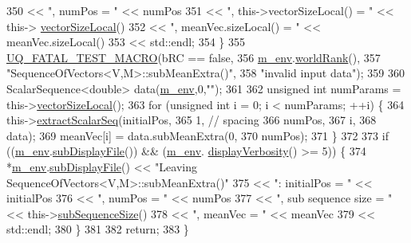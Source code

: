 \begin{DoxyCode}
350                            << \textcolor{stringliteral}{", numPos = "}                  << numPos
351                            << \textcolor{stringliteral}{", this->vectorSizeLocal() = "} << this->
      \hyperlink{class_q_u_e_s_o_1_1_base_vector_sequence_a2fefedf9e5b90f22881103b3f92555f6}{vectorSizeLocal}()
352                            << \textcolor{stringliteral}{", meanVec.sizeLocal() = "}     << meanVec.sizeLocal()
353                            << std::endl;
354   \}
355   \hyperlink{_defines_8h_a56d63d18d0a6d45757de47fcc06f574d}{UQ\_FATAL\_TEST\_MACRO}(bRC == \textcolor{keyword}{false},
356                       \hyperlink{class_q_u_e_s_o_1_1_base_vector_sequence_a8e8824d2a63c5a43bcc6473e3a0491e8}{m\_env}.\hyperlink{class_q_u_e_s_o_1_1_base_environment_a78b57112bbd0e6dd0e8afec00b40ffa7}{worldRank}(),
357                       \textcolor{stringliteral}{"SequenceOfVectors<V,M>::subMeanExtra()"},
358                       \textcolor{stringliteral}{"invalid input data"});
359 
360   ScalarSequence<double> data(\hyperlink{class_q_u_e_s_o_1_1_base_vector_sequence_a8e8824d2a63c5a43bcc6473e3a0491e8}{m\_env},0,\textcolor{stringliteral}{""});
361 
362   \textcolor{keywordtype}{unsigned} \textcolor{keywordtype}{int} numParams = this->\hyperlink{class_q_u_e_s_o_1_1_base_vector_sequence_a2fefedf9e5b90f22881103b3f92555f6}{vectorSizeLocal}();
363   \textcolor{keywordflow}{for} (\textcolor{keywordtype}{unsigned} \textcolor{keywordtype}{int} i = 0; i < numParams; ++i) \{
364     this->\hyperlink{class_q_u_e_s_o_1_1_sequence_of_vectors_ac977b3b26a6af2ae727671f1246262fd}{extractScalarSeq}(initialPos,
365                            1, \textcolor{comment}{// spacing}
366                            numPos,
367                            i,
368                            data);
369     meanVec[i] = data.subMeanExtra(0,
370                                    numPos);
371   \}
372 
373   \textcolor{keywordflow}{if} ((\hyperlink{class_q_u_e_s_o_1_1_base_vector_sequence_a8e8824d2a63c5a43bcc6473e3a0491e8}{m\_env}.\hyperlink{class_q_u_e_s_o_1_1_base_environment_a8a0064746ae8dddfece4229b9ad374d6}{subDisplayFile}()) && (\hyperlink{class_q_u_e_s_o_1_1_base_vector_sequence_a8e8824d2a63c5a43bcc6473e3a0491e8}{m\_env}.
      \hyperlink{class_q_u_e_s_o_1_1_base_environment_a1fe5f244fc0316a0ab3e37463f108b96}{displayVerbosity}() >= 5)) \{
374     *\hyperlink{class_q_u_e_s_o_1_1_base_vector_sequence_a8e8824d2a63c5a43bcc6473e3a0491e8}{m\_env}.\hyperlink{class_q_u_e_s_o_1_1_base_environment_a8a0064746ae8dddfece4229b9ad374d6}{subDisplayFile}() << \textcolor{stringliteral}{"Leaving SequenceOfVectors<V,M>::subMeanExtra()"}
375                            << \textcolor{stringliteral}{": initialPos = "}        << initialPos
376                            << \textcolor{stringliteral}{", numPos = "}            << numPos
377                            << \textcolor{stringliteral}{", sub sequence size = "} << this->\hyperlink{class_q_u_e_s_o_1_1_sequence_of_vectors_a0224bd3e961d86af5d2886301c0c2b86}{subSequenceSize}()
378                            << \textcolor{stringliteral}{", meanVec = "}           << meanVec
379                            << std::endl;
380   \}
381 
382   \textcolor{keywordflow}{return};
383 \}
\end{DoxyCode}
